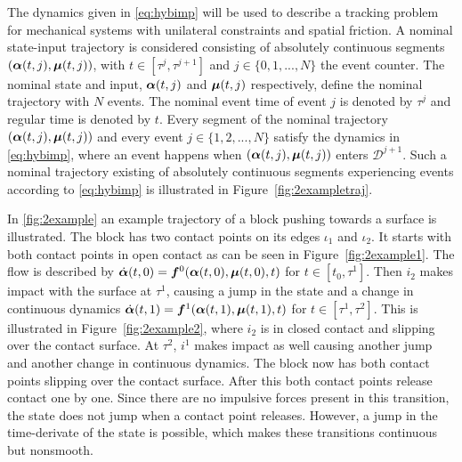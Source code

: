 \documentclass[../DC2017114Bouma.tex]{subfiles}
\begin{document}
The dynamics given in \eqref{eq:hybimp} will be used to describe a tracking problem for mechanical systems with unilateral constraints and spatial friction. A nominal state-input trajectory is considered consisting of absolutely continuous segments $(\boldsymbol{\alpha}(t,j),\boldsymbol{\mu}(t,j))$, with $t\in\left[\tau^j,\tau^{j+1}\right]$ and $j\in\{0,1,...,N\}$ the event counter. The nominal state and input, $\boldsymbol{\alpha}(t,j)$ and $\boldsymbol{\mu}(t,j)$ respectively, define the nominal trajectory with $N$ events. The nominal event time of event $j$ is denoted by $\tau^j$ and regular time is denoted by $t$. Every segment of the nominal trajectory $(\boldsymbol{\alpha}(t,j),\boldsymbol{\mu}(t,j))$ and every event $j\in\{1,2,...,N\}$ satisfy the dynamics in \eqref{eq:hybimp}, where an event happens when $(\boldsymbol{\alpha}(t,j),\boldsymbol{\mu}(t,j))$ enters $\mathcal{D}^{j+1}$. Such a nominal trajectory existing of absolutely continuous segments experiencing events according to \eqref{eq:hybimp} is illustrated in Figure~\ref{fig:2exampletraj}.

In \ref{fig:2example} an example trajectory of a block pushing towards a surface is illustrated. The block has two contact points on its edges $\iota_1$ and $\iota_2$. It starts with both contact points in open contact as can be seen in Figure~\ref{fig:2example1}. The flow is described by $\dot{\boldsymbol{\alpha}}(t,0) = {\boldsymbol{f}}^0(\boldsymbol{\alpha}(t,0),\boldsymbol{\mu}(t,0),t)$ for $t\in[t_0,\tau^1]$. Then $i_2$ makes impact with the surface at $\tau^1$, causing a jump in the state and a change in continuous dynamics $\dot{\boldsymbol{\alpha}}(t,1) = {\boldsymbol{f}}^1(\boldsymbol{\alpha}(t,1),\boldsymbol{\mu}(t,1),t)$ for $t\in[\tau^1,\tau^2]$. This is illustrated in Figure~\ref{fig:2example2}, where $i_2$ is in closed contact and slipping over the contact surface. At $\tau^2$, $i^1$ makes impact as well causing another jump and another change in continuous dynamics. The block now has both contact points slipping over the contact surface. After this both contact points release contact one by one. Since there are no impulsive forces present in this transition, the state does not jump when a contact point releases. However, a jump in the time-derivate of the state is possible, which makes these transitions continuous but nonsmooth.
\end{document}
